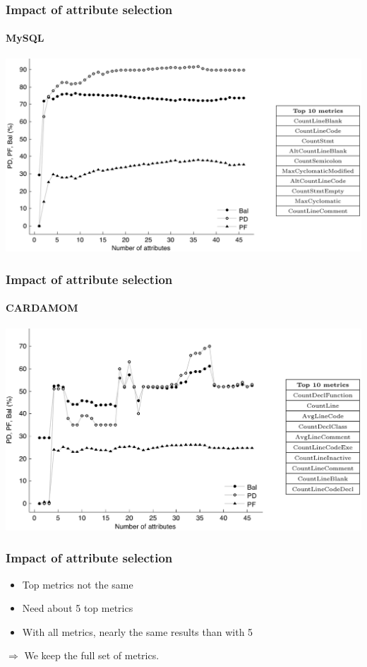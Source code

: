 \begin{frame}
 \frametitle{Impact of attribute selection}
 \framesubtitle{MySQL}
 \begin{center}
  \includegraphics[width=\textwidth]{figures/attributesMysql.png}
 \end{center}
\end{frame}

\begin{frame}
 \frametitle{Impact of attribute selection}
 \framesubtitle{CARDAMOM}
 \begin{center}
  \includegraphics[width=\textwidth]{figures/attributesCardamom.png}
 \end{center}
\end{frame}

\begin{frame}
 \frametitle{Impact of attribute selection}
 \begin{itemize}
  \item Top metrics not the same
  \item Need about 5 top metrics
  \item With all metrics, nearly the same results than with 5
 \end{itemize}
 \vspace{0.5cm}
 \begin{center}
  $\Longrightarrow$ \alert{We keep the full set of metrics.}
 \end{center}
\end{frame}